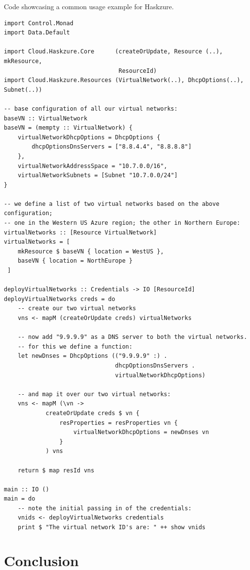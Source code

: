\documentclass[11pt]{report}
\begin{document}
\newpage

\begin{listing}
\caption{Code showcasing a common usage example for Haskzure.}
\label{listing:haskzureExampleHaskell}
\begin{verbatim}
import Control.Monad
import Data.Default

import Cloud.Haskzure.Core      (createOrUpdate, Resource (..), mkResource,
                                 ResourceId)
import Cloud.Haskzure.Resources (VirtualNetwork(..), DhcpOptions(..), Subnet(..))

-- base configuration of all our virtual networks:
baseVN :: VirtualNetwork
baseVN = (mempty :: VirtualNetwork) {
    virtualNetworkDhcpOptions = DhcpOptions {
        dhcpOptionsDnsServers = ["8.8.4.4", "8.8.8.8"]
    },
    virtualNetworkAddressSpace = "10.7.0.0/16",
    virtualNetworkSubnets = [Subnet "10.7.0.0/24"]
}

-- we define a list of two virtual networks based on the above configuration;
-- one in the Western US Azure region; the other in Northern Europe:
virtualNetworks :: [Resource VirtualNetwork]
virtualNetworks = [
    mkResource $ baseVN { location = WestUS },
    baseVN { location = NorthEurope }
 ]

deployVirtualNetworks :: Credentials -> IO [ResourceId]
deployVirtualNetworks creds = do
    -- create our two virtual networks
    vns <- mapM (createOrUpdate creds) virtualNetworks

    -- now add "9.9.9.9" as a DNS server to both the virtual networks.
    -- for this we define a function:
    let newDnses = DhcpOptions (("9.9.9.9" :) .
                                dhcpOptionsDnsServers .
                                virtualNetworkDhcpOptions)

    -- and map it over our two virtual networks:
    vns <- mapM (\vn ->
            createOrUpdate creds $ vn {
                resProperties = resProperties vn {
                    virtualNetworkDhcpOptions = newDnses vn
                }
            ) vns

    return $ map resId vns

main :: IO ()
main = do
    -- note the initial passing in of the credentials:
    vnids <- deployVirtualNetworks credentials
    print $ "The virtual network ID's are: " ++ show vnids
\end{verbatim}
\end{listing}

\chapter{Conclusion}
\end{document}
